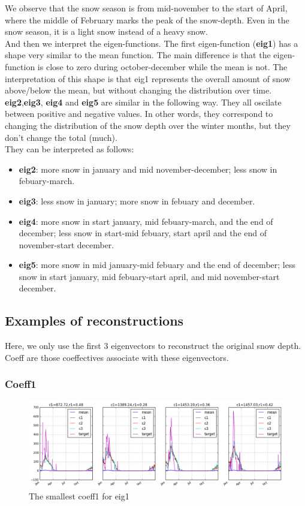 \documentclass{article}
\begin{document}
We observe that the snow season is from mid-november to the start of April, where the middle of February marks the peak of the snow-depth. Even in the snow season, it is a light snow instead of a heavy snow. \\

And then we interpret the eigen-functions. The first eigen-function (\textbf{eig1}) has a shape very similar to the mean function. The main difference is that the eigen-function is close to zero during october-december while the mean is not. The interpretation of this shape is that eig1 represents the overall amount of snow above/below the mean, but without changing the distribution over time.
\textbf{eig2},\textbf{eig3}, \textbf{eig4} and \textbf{eig5} are similar in the following way. They all oscilate between positive and negative values. In other words, they correspond to changing the distribution of the snow depth over the winter months, but they don't change the total (much). \\

They can be interpreted as follows:
\begin{itemize}
\item \textbf{eig2}: more snow in january and mid november-december; less snow in febuary-march.
\item \textbf{eig3}: less snow in january; more snow in febuary and december.
\item \textbf{eig4}: more snow in start january, mid febuary-march, and the end of december; less snow in start-mid febuary, start april and the end of november-start december.
\item \textbf{eig5}: more snow in mid january-mid febuary and the end of december; less snow in start january, mid febuary-start april, and mid november-start december.
\end{itemize}

\subsection*{Examples of reconstructions}
Here, we only use the first $3$ eigenvectors to reconstruct the original snow depth. Coeff are those coeffectives associate with these eigenvectors. 

\subsubsection*{Coeff1}

\begin{figure}[H]
\centering
\includegraphics[width=15cm]{../figures/3_2_coeff1_smallest}
\caption{The smallest coeff1 for eig1}
\end{figure}
\end{document}
